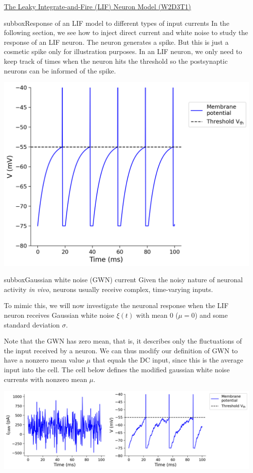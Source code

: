 \begin{textbox}{\href{https://compneuro.neuromatch.io/tutorials/W1D4_GeneralizedLinearModels/student/W1D4_Tutorial1.html}{The Leaky Integrate-and-Fire (LIF) Neuron Model (W2D3T1)} }
\begin{subbox}{subbox}{Response of an LIF model to different types of input currents}
\scriptsize
In the following section, we see how to inject direct current and white noise to study the response of an LIF neuron.
The neuron generates a spike. But this is just a cosmetic spike only for illustration purposes. In an LIF neuron, we only need to keep track of times when the neuron hits the threshold so the postsynaptic neurons can be informed of the spike. 

\centering
\includegraphics[scale=0.2]{Figures/BNM/LIF_Figure2.png}
\end{subbox}

\begin{subbox}{subbox}{Gaussian white noise (GWN) current 
}
\scriptsize
Given the noisy nature of neuronal activity \textit{in vivo}, neurons usually receive complex, time-varying inputs.

To mimic this, we will now investigate the neuronal response when the LIF neuron receives Gaussian white noise $\xi(t)$ with mean 0 ($\mu = 0$) and some standard deviation $\sigma$.

Note that the GWN has zero mean, that is, it describes only the fluctuations of the input received by a neuron. We can thus modify our definition of GWN to have a nonzero mean value $\mu$ that equals the DC input, since this is the average input into the cell. The cell below defines the modified gaussian white noise currents with nonzero mean $\mu$.

\centering
\includegraphics[scale=0.25]{Figures/BNM/LIF_Figure3.png}
\end{subbox}
\end{textbox}

